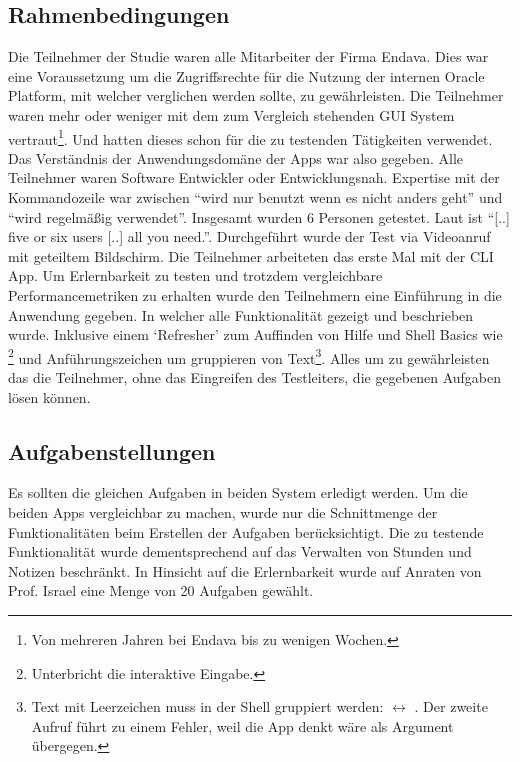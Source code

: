 \documentclass[oneside,bibliography=totocnumbered,BCOR=5mm]{scrbook}
\begin{document}
\subsection{Rahmenbedingungen}

Die Teilnehmer der Studie waren alle Mitarbeiter der Firma Endava. Dies
war eine Voraussetzung um die Zugriffsrechte für die Nutzung der internen
Oracle Platform, mit welcher verglichen werden sollte, zu gewährleisten.
Die Teilnehmer waren mehr oder weniger mit dem zum Vergleich stehenden GUI
System vertraut\footnote{Von mehreren Jahren bei Endava bis zu wenigen
Wochen.}. Und hatten dieses schon für die zu testenden Tätigkeiten verwendet.
Das Verständnis der Anwendungsdomäne der Apps war also gegeben. Alle
Teilnehmer waren Software Entwickler oder Entwicklungsnah. Expertise mit der
Kommandozeile war zwischen ``wird nur benutzt wenn es nicht anders geht'' und
``wird regelmäßig verwendet''. Insgesamt wurden 6 Personen getestet. Laut
\textcite[11]{Spolsky_2001} ist ``[..] five or six users [..] all you need.''.
Durchgeführt wurde der Test via Videoanruf mit geteiltem Bildschirm. Die
Teilnehmer arbeiteten das erste Mal mit der CLI App. Um Erlernbarkeit zu testen
und trotzdem vergleichbare Performancemetriken zu erhalten wurde den Teilnehmern
eine Einführung in die Anwendung gegeben. In welcher alle Funktionalität gezeigt
und beschrieben wurde. Inklusive einem `Refresher' zum Auffinden von Hilfe
und Shell Basics wie \footnote{Unterbricht die interaktive
Eingabe.} und Anführungszeichen um gruppieren von Text\footnote{Text mit
Leerzeichen muss in der Shell gruppiert werden: 
$\leftrightarrow$ . Der zweite Aufruf führt zu
einem Fehler, weil die App denkt  wäre als Argument
übergegen.}. Alles um zu gewährleisten das die Teilnehmer, ohne das Eingreifen
des Testleiters, die gegebenen Aufgaben lösen können.

\subsection{Aufgabenstellungen}
\label{aufgaben}

Es sollten die gleichen Aufgaben in beiden System erledigt werden. Um die beiden
Apps vergleichbar zu machen, wurde nur die Schnittmenge der Funktionalitäten
beim Erstellen der Aufgaben berücksichtigt. Die zu testende Funktionalität
wurde dementsprechend auf das Verwalten von Stunden und Notizen beschränkt. In
Hinsicht auf die Erlernbarkeit wurde auf Anraten von Prof. Israel eine Menge von
20 Aufgaben gewählt.
\end{document}
